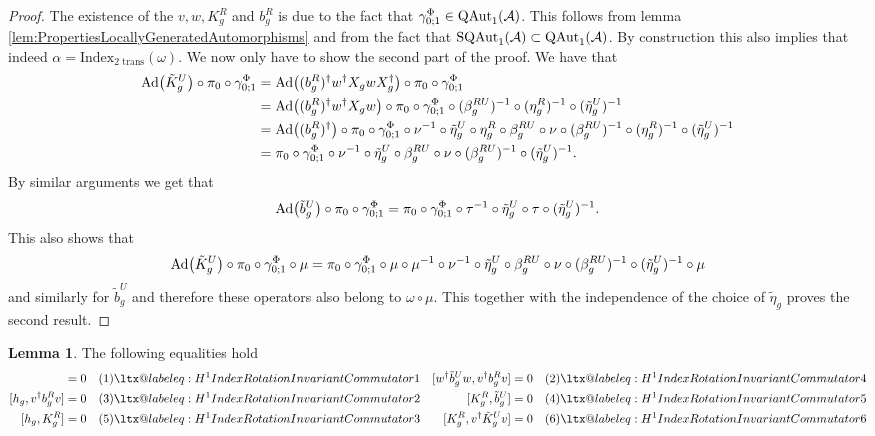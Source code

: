 \documentclass[12pt,a4paper,twoside]{article}
\makeatletter
\newcommand\Label[1]{&\refstepcounter{equation}(\theequation)\ltx@label{#1}&}
\let\originalleft\left
\let\originalright\right
\renewcommand{\left}{\mathopen{}\mathclose\bgroup\originalleft}
\renewcommand{\right}{\aftergroup\egroup\originalright}
\renewcommand{\AA}{\mathcal A}
\newcommand{\Ad}[1]{\textrm{Ad}\left(#1\right)}
\newcommand{\QAut}[1]{\textrm{QAut}_1\left(#1\right)}
\theoremstyle{definition}
\newtheorem{lemma}[theorem]{Lemma}
\numberwithin{equation}{section}
\makeatother
\begin{document}
\begin{proof}
	The existence of the $v,w,K_g^R$ and $b_g^R$ is due to the fact that $\gamma^\Phi_{0;1}\in \QAut{\AA}$. This follows from lemma \ref{lem:PropertiesLocallyGeneratedAutomorphisms} and from the fact that $\textrm{SQAut}_1(\AA)\subset \QAut{\AA}$. By construction this also implies that indeed $\alpha=\textrm{Index}_{\text{2 trans}}(\omega)$. We now only have to show the second part of the proof. We have that
	\begin{align}
		\Ad{\tilde{K}_g^U}\circ\pi_0\circ\gamma^\Phi_{0;1}&=\Ad{(b_g^R)^\dagger w^\dagger X_g w X_g^\dagger}\circ\pi_0\circ\gamma^\Phi_{0;1}\\
		&=\Ad{(b_g^R)^\dagger w^\dagger X_g w}\circ\pi_0\circ\gamma^\Phi_{0;1}\circ(\beta_g^{RU})^{-1}\circ(\eta_g^R)^{-1}\circ(\tilde{\eta}_g^U)^{-1}\\
		&=\Ad{(b_g^R)^\dagger}\circ\pi_0\circ\gamma^\Phi_{0;1}\circ\nu^{-1}\circ\tilde{\eta}_g^U\circ\eta_g^R\circ\beta_g^{RU}\circ\nu\circ(\beta_g^{RU})^{-1}\circ(\eta_g^R)^{-1}\circ(\tilde{\eta}_g^U)^{-1}\\
		&=\pi_0\circ\gamma^\Phi_{0;1}\circ\nu^{-1}\circ\tilde{\eta}_g^U\circ\beta_g^{RU}\circ\nu\circ(\beta_g^{RU})^{-1}\circ(\tilde{\eta}_g^U)^{-1}.
	\end{align}
	By similar arguments we get that
	\begin{equation}
		\Ad{\tilde{b}_g^U}\circ\pi_0\circ\gamma^\Phi_{0;1}=\pi_0\circ\gamma^\Phi_{0;1}\circ\tau^{-1}\circ\tilde{\eta}_g^U\circ\tau\circ(\tilde{\eta}_g^U)^{-1}.
	\end{equation}
	This also shows that
	\begin{equation}
		\Ad{\tilde{K}_g^U}\circ\pi_0\circ\gamma^\Phi_{0;1}\circ\mu=\pi_0\circ\gamma^\Phi_{0;1}\circ\mu\circ\mu^{-1}\circ\nu^{-1}\circ\tilde{\eta}_g^U\circ\beta_g^{RU}\circ\nu\circ(\beta_g^{RU})^{-1}\circ(\tilde{\eta}_g^U)^{-1}\circ\mu
	\end{equation}
	and similarly for $\tilde{b}_g^U$ and therefore these operators also belong to $\omega\circ\mu$. This together with the independence of the choice of $\tilde{\eta}_g$ proves the second result.
\end{proof}
\begin{lemma}
	The following equalities hold
	\begin{align*}
		[h_g ,w^\dagger \tilde{b}_g^U w]&=0 \Label{eq:H^1IndexRotationInvariantCommutator1}& [w^\dagger \tilde{b}_g^U w,v^\dagger b_g^R v]&=0 \Label{eq:H^1IndexRotationInvariantCommutator4}\\
		[h_g, v^\dagger b_g^R v]&=0 \Label{eq:H^1IndexRotationInvariantCommutator2}& [K_g^R,\tilde{b}_g^U] &= 0 \Label{eq:H^1IndexRotationInvariantCommutator5}\\
		[h_g ,K_g^R]&=0 \Label{eq:H^1IndexRotationInvariantCommutator3}& [K_g^R,v^\dagger \tilde{K}^U_g v] &= 0 \Label{eq:H^1IndexRotationInvariantCommutator6}
	\end{align*}
\end{lemma}
\end{document}
